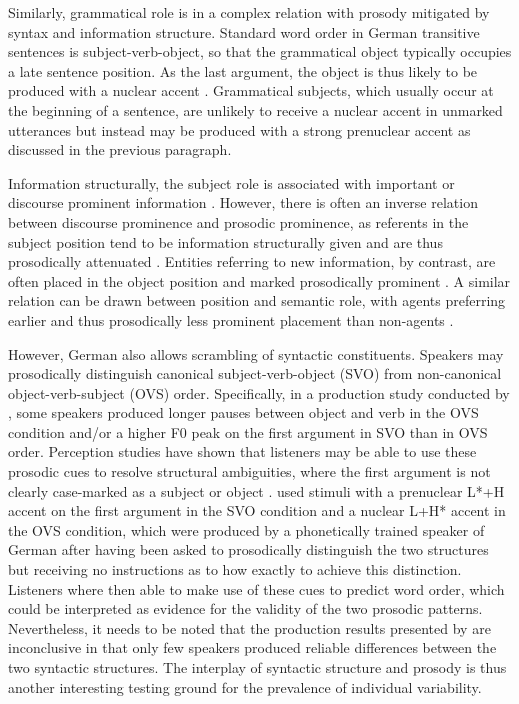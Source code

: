 Similarly, grammatical role is in a complex relation with prosody mitigated by syntax and information structure. Standard word order in German transitive sentences is subject-verb-object, so that the grammatical object typically occupies a late sentence position. As the last argument, the object is thus likely to be produced with a nuclear accent \citep{griceGermanIntonationAutosegmentalMetrical2005}. Grammatical subjects, which usually occur at the beginning of a sentence, are unlikely to receive a nuclear accent in unmarked utterances \citep{feryGermanIntonationalPatterns1993} but instead may be produced with a strong prenuclear accent as discussed in the previous paragraph. 

Information structurally, the subject role is associated with important or discourse prominent information \citep{arnoldReferenceFormDiscourse1998, vonheusingerDiscourseProminenceDefinition2019}. However, there is often an inverse relation between discourse prominence and prosodic prominence, as referents in the subject position tend to be information structurally given and are thus prosodically attenuated \citep[e.g.,][]{baumannAccentTypeGivenness2003}. Entities referring to new information, by contrast, are often placed in the object position and marked prosodically prominent \citep{hallidayNotesTransitivityTheme1967, terkenDeaccentuationWordsRepresenting1994}. A similar relation can be drawn between position and semantic role, with agents preferring earlier and thus prosodically less prominent placement than non-agents \citep{himmelmannProminenceProsodyFirst2015}.

However, German also allows scrambling of syntactic constituents. Speakers may prosodically distinguish canonical subject-verb-object (SVO) from non-ca\-non\-i\-cal object-verb-subject (OVS) order. Specifically, in a production study conducted by \citet{huttenlauchIndividualVariabilityProsodic2022}, some speakers produced longer pauses between object and verb in the OVS condition and/or a higher F0 peak on the first argument in SVO than in OVS order. Perception studies have shown that listeners may be able to use these prosodic cues to resolve structural ambiguities, where the first argument is not clearly case-marked as a subject or object \citep{weberRoleProsodyInterpretation2006, schneiderEnhancedProsodyAdds2024}. \citet{weberRoleProsodyInterpretation2006} used stimuli with a prenuclear L*+H accent on the first argument in the SVO condition and a nuclear L+H* accent in the OVS condition, which were produced by a phonetically trained speaker of German after having been asked to prosodically distinguish the two structures but receiving no instructions as to how exactly to achieve this distinction. Listeners where then able to make use of these cues to predict word order, which could be interpreted as evidence for the validity of the two prosodic patterns. Nevertheless, it needs to be noted that the production results presented by \citet{huttenlauchIndividualVariabilityProsodic2022} are inconclusive in that only few speakers produced reliable differences between the two syntactic structures. The interplay of syntactic structure and prosody is thus another interesting testing ground for the prevalence of individual variability.

